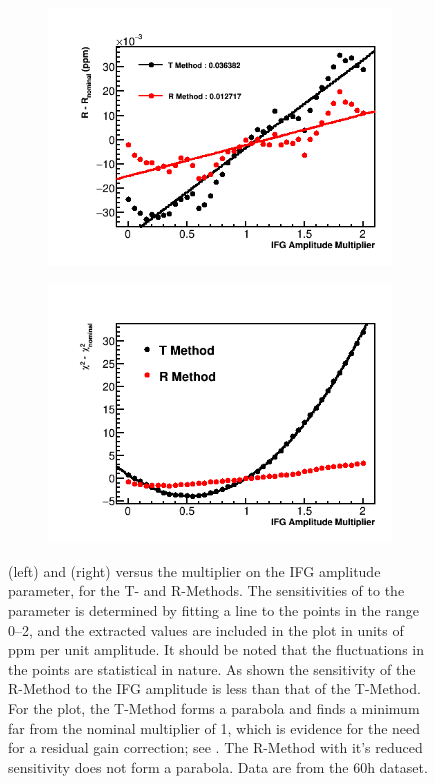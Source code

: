 \begin{figure}[h]
\centering
    \begin{subfigure}[t]{0.45\textwidth}
        \centering
        \includegraphics[width=\textwidth]{IFG_Amplitude_Compare_R}
    \end{subfigure}%
    \hspace{1cm}
    \begin{subfigure}[t]{0.45\textwidth}
        \centering
        \includegraphics[width=\textwidth]{IFG_Amplitude_Compare_Chisq}
    \end{subfigure}
\caption[]{\R (left) and \chisq (right) versus the multiplier on the IFG amplitude parameter, for the T- and R-Methods. The sensitivities of \R to the parameter is determined by fitting a line to the points in the range 0--2, and the extracted values are included in the plot in units of ppm per unit amplitude. It should be noted that the fluctuations in the points are statistical in nature. As shown the sensitivity of the R-Method to the IFG amplitude is less than that of the T-Method. For the \chisq plot, the T-Method forms a parabola and finds a minimum far from the nominal multiplier of 1, which is evidence for the need for a residual gain correction; see . The R-Method with it's reduced sensitivity does not form a parabola. Data are from the 60h dataset.}

\end{figure}
